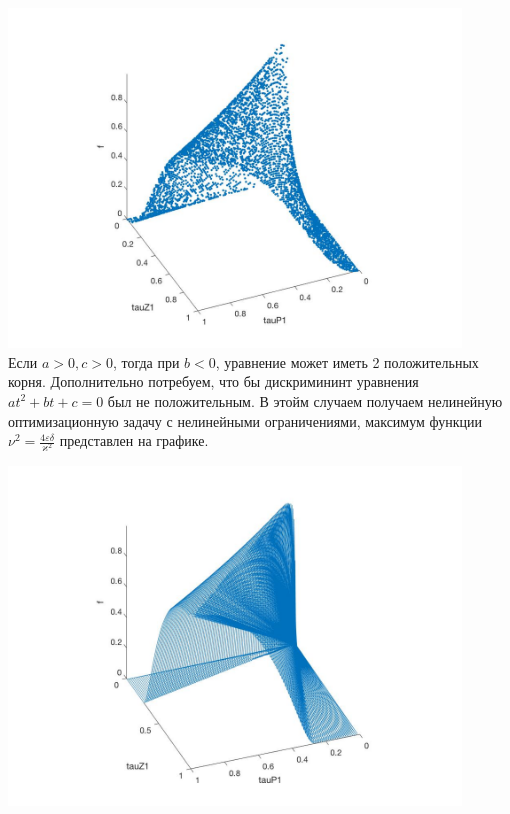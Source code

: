 \documentclass[a4paper,14pt]{extarticle} %
\begin{document}
\includegraphics[width=12cm]{images/filter2_tau0.jpg}\\

Если $a > 0, c > 0$, тогда  при $b < 0$, уравнение может иметь 2 положительных корня. Дополнительно потребуем, что бы дискримининт уравнения $at^2 + bt +c = 0$ был не положительным. В этойм случаем получаем нелинейную оптимизационную задачу с нелинейными ограничениями, максимум функции $\nu^2 = \frac{4\varepsilon\delta}{\varkappa^2}$ представлен на графике.

\includegraphics[width=12cm]{images/filter2_tau0_1.jpg}\\
\end{document}
